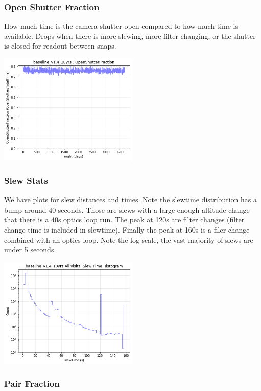\subsubsection{Open Shutter Fraction}

How much time is the camera shutter open compared to how much time is available. Drops when there is more slewing, more filter changing, or the shutter is closed for readout between snaps.

\includegraphics[width=0.5\textwidth]{metric_summary/glance/thumb.baseline_v1_4_10yrs_OpenShutterFraction_ONED_BinnedData.png}

\subsubsection{Slew Stats}

We have plots for slew distances and times. Note the slewtime distribution has a bump around 40 seconds. Those are slews with a large enough altitude change that there is a 40s optics loop run. The peak at 120s are filter changes (filter change time is included in slewtime). Finally the peak at 160s is a filer change combined with an optics loop. Note the log scale, the vast majority of slews are under 5 seconds.

\includegraphics[width=0.5\textwidth]{metric_summary/glance/thumb.baseline_v1_4_10yrs_Slew_Time_Histogram_All_visits_ONED_BinnedData.png}

\subsubsection{Pair Fraction}

